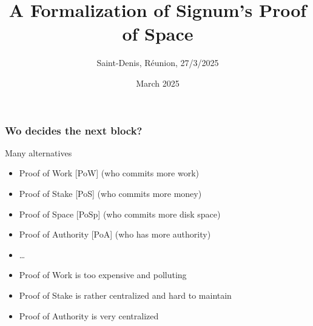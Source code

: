 \documentclass[11pt]{beamer}  %
\subtitle{Saint-Denis, R\'eunion, 27/3/2025}
\title{A Formalization of Signum's Proof of Space}
\institute{Universit\`a di Verona, Italy}
\date{March 2025}
\begin{document}
\begin{frame}
  \titlepage
\end{frame}

\begin{frame}
  \frametitle{Wo decides the next block?}

  \begin{greenbox}{Many alternatives}
    \begin{itemize}
    \item Proof of Work [PoW] (who commits more work)
    \item Proof of Stake [PoS] (who commits more money)
    \item Proof of Space [PoSp] (who commits more disk space)
    \item Proof of Authority [PoA] (who has more authority)
    \item \ldots
    \end{itemize}
  \end{greenbox}

  \bigskip
  
  \begin{greenbox}{}
  \begin{itemize}
  \item Proof of Work is too expensive and polluting
  \item Proof of Stake is rather centralized and hard to maintain
  \item Proof of Authority is very centralized
  \end{itemize}
  \end{greenbox}

\end{frame}
\end{document}
